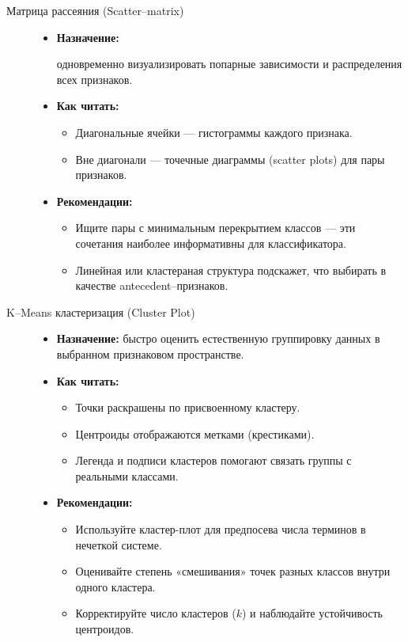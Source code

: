 \begin{description}
  \item[Матрица рассеяния (Scatter–matrix)]  
    \hfill
    \begin{itemize}
      \item \textbf{Назначение:} 
        
        одновременно визуализировать попарные зависимости и распределения всех признаков.
      \item \textbf{Как читать:}  
        \begin{itemize}
          \item Диагональные ячейки — гистограммы каждого признака.  
          \item Вне диагонали — точечные диаграммы (scatter plots) для пары признаков.
        \end{itemize}
      \item \textbf{Рекомендации:}  
        \begin{itemize}
          \item Ищите пары с минимальным перекрытием классов — эти сочетания наиболее информативны для классификатора.  
          \item Линейная или кластераная структура подскажет, что выбирать в качестве antecedent–признаков.
        \end{itemize}
    \end{itemize}

  \item[K–Means кластеризация (Cluster Plot)]  
    \hfill
    \begin{itemize}
      \item \textbf{Назначение:} быстро оценить естественную группировку данных в выбранном признаковом пространстве.
      \item \textbf{Как читать:}  
        \begin{itemize}
          \item Точки раскрашены по присвоенному кластеру.  
          \item Центроиды отображаются метками (крестиками).  
          \item Легенда и подписи кластеров помогают связать группы с реальными классами.
        \end{itemize}
      \item \textbf{Рекомендации:}  
        \begin{itemize}
          \item Используйте кластер-плот для предпосева числа терминов в нечеткой системе.  
          \item Оценивайте степень «смешивания» точек разных классов внутри одного кластера.  
          \item Корректируйте число кластеров ($k$) и наблюдайте устойчивость центроидов.
        \end{itemize}
    \end{itemize}
\end{description}

